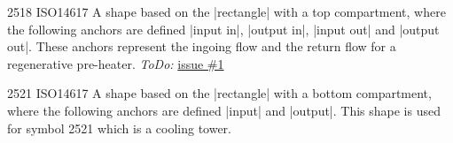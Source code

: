 \documentclass[a4paper]{ltxdoc}
\begin{document}
\begin{shape}{2518 ISO14617}
 A shape based on the |rectangle| with a top compartment, where the following anchors are defined |input in|, |output in|, |input out| and |output out|. These anchors represent the ingoing flow and the return flow for a regenerative pre-heater.
 \emph{ToDo:} \href{https://github.com/peer23peer/PIDcircuitTikZ/issues/1}{issue \#1}
 \begin{codeexample}[]
 \end{codeexample}
\end{shape}

\begin{shape}{2521 ISO14617}
 A shape based on the |rectangle| with a bottom compartment, where the following anchors are defined |input| and |output|. This shape is used for symbol 2521 which is a cooling tower.
 \begin{codeexample}[]
 \end{codeexample}
\end{shape}
\end{document}
